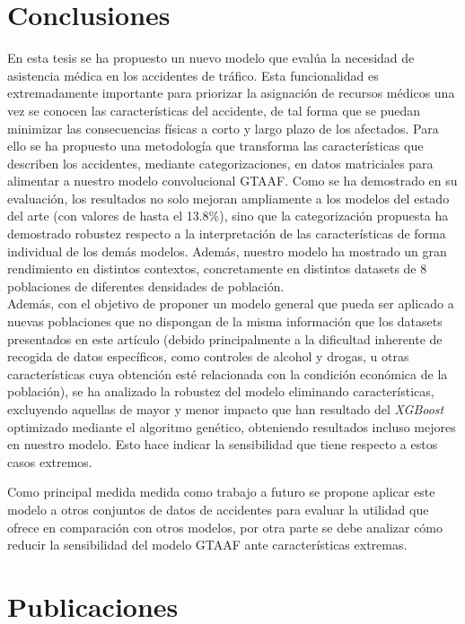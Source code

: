 \documentclass{uathesis-es}
\begin{document}
{		
		\chapter{Conclusiones}
		
		
		En esta tesis se ha propuesto un nuevo modelo que evalúa la necesidad de asistencia médica en los accidentes de tráfico. Esta funcionalidad es extremadamente importante para priorizar la asignación de recursos médicos una vez se conocen las características del accidente, de tal forma que se puedan minimizar las consecuencias físicas a corto y largo plazo de los afectados. Para ello se ha propuesto una metodología que transforma las características que describen los accidentes, mediante categorizaciones, en datos matriciales para alimentar a nuestro modelo convolucional GTAAF. Como se ha demostrado en su evaluación, los resultados no solo mejoran ampliamente a los modelos del estado del arte (con valores de hasta el 13.8\%), sino que la categorización propuesta ha demostrado robustez respecto a la interpretación de las características de forma individual de los demás modelos. Además, nuestro modelo ha mostrado un gran rendimiento en distintos contextos, concretamente en  distintos datasets de 8 poblaciones de diferentes densidades de población.\\
		
		Además, con el objetivo de proponer un modelo general que pueda ser aplicado a nuevas poblaciones que no dispongan de la misma información que los datasets presentados en este artículo (debido principalmente a la dificultad inherente de recogida de datos específicos, como controles de alcohol y drogas, u otras características cuya obtención esté relacionada con la condición económica de la población), se ha analizado la robustez del modelo eliminando características, excluyendo aquellas de mayor y menor impacto que han resultado del \textit{XGBoost} optimizado mediante el algoritmo genético, obteniendo resultados incluso mejores en nuestro modelo. Esto hace indicar la sensibilidad que tiene respecto a estos casos extremos.
		
		Como principal medida medida como trabajo a futuro se propone aplicar este modelo a otros conjuntos de datos de accidentes para evaluar la utilidad que ofrece en comparación con otros modelos, por otra parte se debe analizar cómo reducir la sensibilidad del modelo GTAAF ante características extremas.
		
		\chapter{Publicaciones}
		
}
\end{document}
